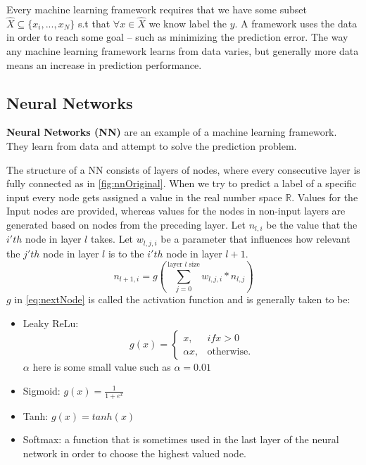 \documentclass[dissertation.tex]{subfiles}
\begin{document}
Every machine learning framework requires that we have some subset
$\hat{X}\subseteq\{x_i,...,x_N\}$ s.t that $ \forall x\in\hat{X}$ we know label
the $y$. A framework uses the data in order to reach some goal -- such as
minimizing the prediction error. The way any machine learning framework learns
from data varies, but generally more data means an increase in prediction
performance.

\subsection{Neural Networks} 

\textbf{Neural Networks (NN)} are an example of a machine learning framework. They learn
from data and attempt to solve the prediction problem.

The structure of a NN consists of layers of nodes, where every consecutive
layer is fully connected as in \autoref{fig:nnOriginal}.  When we try to
predict a label of a specific input every node gets assigned a value in the
real number space $\mathbb{R}$. Values for the Input nodes are provided,
whereas values for the nodes in non-input layers are generated based on nodes
from the preceding layer. Let $n_{l,i}$ be the value that the $i'th$ node in
layer $l$ takes. Let $w_{l,j,i}$ be a parameter that influences how relevant
the $j'th$ node in layer $l$ is to the $i'th$ node in layer $l+1$.
\begin{equation}
  n_{l+1,i} = g(\sum_{j = 0}^{\text{layer }l\text{ size}} w_{l,j,i}*n_{l,j})
  \label{eq:nextNode}
\end{equation}
$g$ in \autoref{eq:nextNode} is called the activation function and is generally 
taken to be:
\begin{itemize}
  \item{
      Leaky ReLu: 
      \begin{equation*}
        g(x) = \begin{cases}
          x, & if x > 0 \\
          \alpha{x}, & \text{otherwise}.
        \end{cases}
      \end{equation*}
      $\alpha$ here is some small value such as $\alpha = 0.01$
    }
  \item{
      Sigmoid: $g(x) = \frac{1}{1+e^x}$
    }
  \item{
      Tanh: $g(x) = tanh(x)$
    }
  \item{
      Softmax: a function that is sometimes used in the last layer of the neural
      network in order to choose the highest valued node.
    }
\end{itemize}
\end{document}

